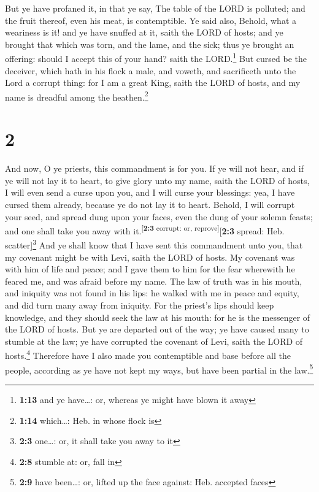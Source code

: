  But ye have profaned it, in that ye say, The table of
the LORD is polluted; and the fruit thereof, even his meat, is
contemptible.  Ye said also, Behold, what a weariness is
it! and ye have snuffed at it, saith the LORD of hosts; and ye brought
that which was torn, and the lame, and the sick; thus ye brought an
offering: should I accept this of your hand? saith the LORD.\footnote{\textbf{1:13}
  and ye have\ldots: or, whereas ye might have blown it away}
 But cursed be the deceiver, which hath in his flock a
male, and voweth, and sacrificeth unto the Lord a corrupt thing: for I
am a great King, saith the LORD of hosts, and my name is dreadful among
the heathen.\footnote{\textbf{1:14} which\ldots: Heb. in whose flock is}

\hypertarget{section-1}{%
\section{2}\label{section-1}}

 And now, O ye priests, this commandment is for you.
 If ye will not hear, and if ye will not lay it to heart,
to give glory unto my name, saith the LORD of hosts, I will even send a
curse upon you, and I will curse your blessings: yea, I have cursed them
already, because ye do not lay it to heart.  Behold, I
will corrupt your seed, and spread dung upon your faces, even the dung
of your solemn feasts; and one shall take you away with
it.\textsuperscript{{[}\textbf{2:3} corrupt: or,
reprove{]}}{[}\textbf{2:3} spread: Heb. scatter{]}\footnote{\textbf{2:3}
  one\ldots: or, it shall take you away to it}  And ye
shall know that I have sent this commandment unto you, that my covenant
might be with Levi, saith the LORD of hosts.  My covenant
was with him of life and peace; and I gave them to him for the fear
wherewith he feared me, and was afraid before my name. 
The law of truth was in his mouth, and iniquity was not found in his
lips: he walked with me in peace and equity, and did turn many away from
iniquity.  For the priest's lips should keep knowledge,
and they should seek the law at his mouth: for he is the messenger of
the LORD of hosts.  But ye are departed out of the way; ye
have caused many to stumble at the law; ye have corrupted the covenant
of Levi, saith the LORD of hosts.\footnote{\textbf{2:8} stumble at: or,
  fall in}  Therefore have I also made you contemptible
and base before all the people, according as ye have not kept my ways,
but have been partial in the law.\footnote{\textbf{2:9} have been\ldots:
  or, lifted up the face against: Heb. accepted faces}

